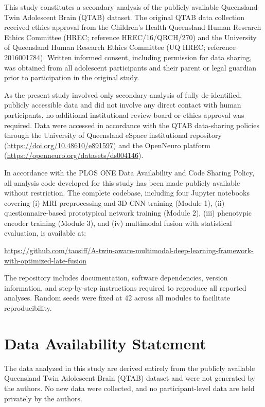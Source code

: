 \documentclass[10pt,letterpaper]{article}
\begin{document}
This study constitutes a secondary analysis of the publicly available Queensland Twin Adolescent Brain (QTAB) dataset. The original QTAB data collection received ethics approval from the Children's Health Queensland Human Research Ethics Committee (HREC; reference HREC/16/QRCH/270) and the University of Queensland Human Research Ethics Committee (UQ HREC; reference 2016001784). Written informed consent, including permission for data sharing, was obtained from all adolescent participants and their parent or legal guardian prior to participation in the original study.

As the present study involved only secondary analysis of fully de-identified, publicly accessible data and did not involve any direct contact with human participants, no additional institutional review board or ethics approval was required. Data were accessed in accordance with the QTAB data-sharing policies through the University of Queensland eSpace institutional repository (\url{https://doi.org/10.48610/e891597}) and the OpenNeuro platform (\url{https://openneuro.org/datasets/ds004146}).

In accordance with the PLOS ONE Data Availability and Code Sharing Policy, all analysis code developed for this study has been made publicly available without restriction. The complete codebase, including four Jupyter notebooks covering (i) MRI preprocessing and 3D-CNN training (Module 1), (ii) questionnaire-based prototypical network training (Module 2), (iii) phenotypic encoder training (Module 3), and (iv) multimodal fusion with statistical evaluation, is available at:

\noindent\sloppy\url{https://github.com/taosiff/A-twin-aware-multimodal-deep-learning-framework-with-optimized-late-fusion}\fussy

The repository includes documentation, software dependencies, version information, and step-by-step instructions required to reproduce all reported analyses. Random seeds were fixed at 42 across all modules to facilitate reproducibility.

\section*{Data Availability Statement}

The data analyzed in this study are derived entirely from the publicly available Queensland Twin Adolescent Brain (QTAB) dataset and were not generated by the authors. No new data were collected, and no participant-level data are held privately by the authors.
\end{document}
